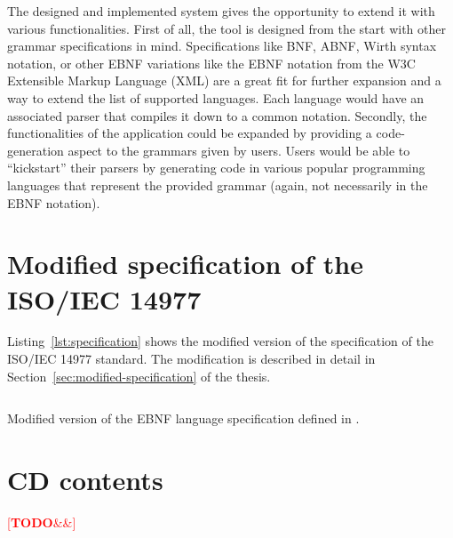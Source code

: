 \documentclass[english,bachelors,forcepolishlogotype]{wizthesis}
\newcommand{\todo}[1]{%
  \textcolor{red}{[\textbf{TODO}\ifx&#1&{}\else{ }\fi\emph{#1}]}%
}
\begin{document}
The designed and implemented system gives the opportunity to extend it with
various functionalities. First of all, the tool is designed from the start with
other grammar specifications in mind. Specifications like BNF, ABNF, Wirth
syntax notation, or other EBNF variations like the EBNF notation from the W3C
Extensible Markup Language (XML) are a great fit for further expansion and a way
to extend the list of supported languages. Each language would have an
associated parser that compiles it down to a common notation. Secondly, the
functionalities of the application could be expanded by providing a
code-generation aspect to the grammars given by users. Users would be able to
``kickstart'' their parsers by generating code in various popular programming
languages that represent the provided grammar (again, not necessarily in the
EBNF notation).



\listoffigures

\listoftables

\listoflistings

\begin{appendices}

\chapter{Modified specification of the ISO/IEC 14977} \label{ch:modified-spec}

Listing~\ref{lst:specification} shows the modified version of the specification
of the ISO/IEC 14977 standard. The modification is described in detail in
Section~\ref{sec:modified-specification} of the thesis.

\begin{listing}[H]
  \inputminted[fontsize=\small,frame=lines,breaklines,linenos]
    {lexers/ebnf_lexer.py:EbnfLexer -x}{listings/specification.ebnf}
  \caption{Modified version of the EBNF language specification defined in
  \cite{iso-14977}.}
  \label{lst:specification}
\end{listing}

\chapter{CD contents}

\todo{}

\end{appendices}
\end{document}
